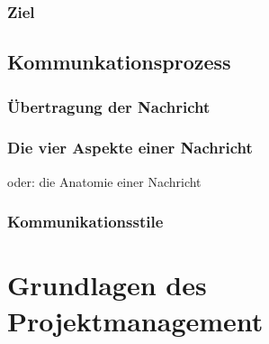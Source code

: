 \subsection{Ziel}
\section{Kommunkationsprozess}
\subsection{Übertragung der Nachricht}
\subsection{Die vier Aspekte einer Nachricht}
oder: die Anatomie einer Nachricht

\subsection{Kommunikationsstile}

\chapter{Grundlagen des Projektmanagement}



 

